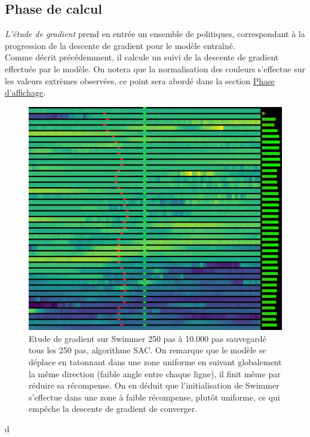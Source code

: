 \documentclass[12pt]{article}
\begin{document}
\subsection{Phase de calcul}

\emph{L'étude de gradient} prend en entrée un ensemble de politiques, correspondant à la progression de la descente de gradient pour le modèle entraîné. \\

Comme décrit précédemment, il calcule un suivi de la descente de gradient effectuée par le modèle. On notera que la normalisation des couleurs s'effectue sur les valeurs extrèmes observées, ce point sera abordé dans la section \hyperref[sec:affichage]{Phase d'affichage}. \\

\begin{figure}[htp]
    \centering
    \includegraphics[width=15cm]{Images/gradientStudy_swimmer}
    \caption{Etude de gradient sur Swimmer 250 pas à 10.000 pas sauvegardé tous les 250 pas, algorithme SAC. On remarque que le modèle se déplace en tatonnant dans une zone uniforme en suivant globalement la même direction (faible angle entre chaque ligne), il finit même par réduire sa récompense. On en déduit que l'initialisation de Swimmer s'effectue dans une zone à faible récompense, plutôt uniforme, ce qui empêche la descente de gradient de converger.}
    \label{fig:gradientStudy}
\end{figure}d
\end{document}
